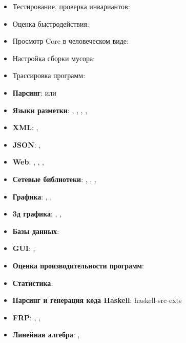 
\begin{itemize}

\item Тестирование, проверка инвариантов: 

\item Оценка быстродействия: 

\item Просмотр Core в человеческом виде: 

\item Настройка сборки мусора: 

\item Трассировка программ: 

\end{itemize}


\begin{itemize}

\item \textbf{Парсинг}:  или 
\item \textbf{Языки разметки}: , , , 
        , 
\item \textbf{XML}: , 
\item \textbf{JSON}: , 
\item \textbf{Web}: , , , 
\item \textbf{Сетевые библиотеки}: , , , 

\item \textbf{Графика}: , , 
\item \textbf{3д графика}: , ,  

\item \textbf{Базы данных}: 


\item \textbf{GUI}: , 

\item \textbf{Оценка производительности программ}: 

\item \textbf{Статистика}: 

\item \textbf{Парсинг и генерация кода Haskell}: haskell-src-exts

\item \textbf{FRP}: , , 

\item \textbf{Линейная алгебра}: , 

\end{itemize}
